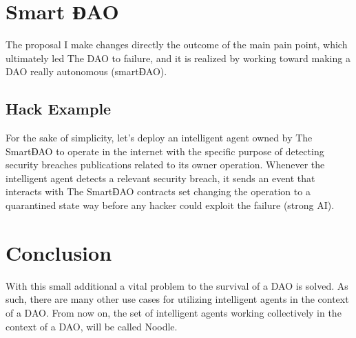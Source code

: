 \documentclass[twoside,twocolumn]{article}
\begin{document}
\section{Smart ƉAO}

The proposal I make changes directly the outcome of the main pain point, which ultimately led The DAO to failure, and it is realized by working toward making a DAO really autonomous (smartƉAO).

\subsection{Hack Example}

For the sake of simplicity, let’s deploy an intelligent agent owned by The SmartƉAO to operate in the internet with the specific purpose of detecting security breaches publications related to its owner operation.
Whenever the intelligent agent detects a relevant security breach, it sends an event that interacts with The SmartƉAO contracts set changing the operation to a quarantined state way before any hacker could exploit the failure (strong AI\cite{kurzweil2000age}).

\section{Conclusion}

With this small additional a vital problem to the survival of a DAO is solved. As such, there are many other use cases for utilizing intelligent agents in the context of a DAO. From now on, the set of intelligent agents working collectively in the context of a DAO, will be called Noodle.

\end{document}
